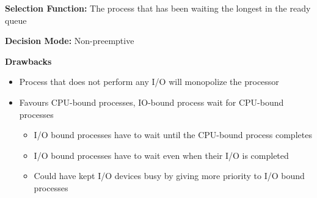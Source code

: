 \documentclass[a4paper,11pt]{article}
\begin{document}
\textbf{Selection Function:} The process that has been waiting the longest in the ready queue\par

\textbf{Decision Mode:} Non-preemptive\par



\textbf{Drawbacks}\par

\Needspace{76pt}
\begin{itemize}
\item Process that does not perform any I/O will monopolize the processor
\item Favours CPU-bound processes, IO-bound process wait for CPU-bound processes 
\begin{itemize}
\item I/O bound processes have to wait until the CPU-bound process completes
\item I/O bound processes have to wait even when their I/O is completed
\item Could have kept I/O devices busy by giving more priority to I/O bound processes
\end{itemize}
\end{itemize}
\end{document}

